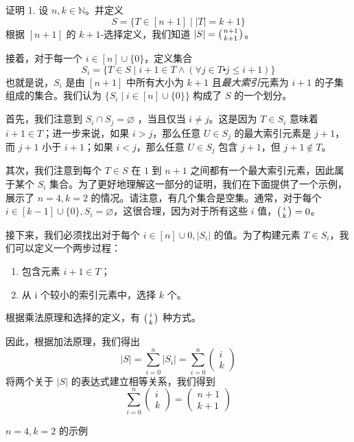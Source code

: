 \begin{proofs}{证明 1.}
    设 $n,k \in \mathbb{N}$。并定义
    \[S = \{T \in [n + 1] \mid |T| = k + 1\}\]
    根据 $[n+1]$ 的 $k+1$-选择定义，我们知道 $|S| = \big({n+1 \atop k+1}\big)$。

    接着，对于每一个 $i \in [n] \cup \{0\}$，定义集合
    \[S_i = \{T \in S \mid i + 1 \in T \land (\forall j \in T \centerdot j \le i + 1)\}\]
    也就是说，$S_i$ 是由 $[n + 1]$ 中所有大小为 $k + 1$ 且\emph{最大索引}元素为 $i + 1$ 的子集组成的集合。我们认为 $\{S_i \mid i \in [n] \cup \{0\}\}$ 构成了 $S$ 的一个划分。

    首先，我们注意到 $S_i \cap S_j = \varnothing$ ，当且仅当 $i \ne j$。这是因为 $T ∈ S_i$ 意味着 $i + 1 \in T$；进一步来说，如果 $i > j$，那么任意 $U \in S_j$ 的最大索引元素是 $j + 1$，而 $j + 1$ 小于 $i + 1$；如果 $i < j$，那么任意 $U ∈ S_j$ 包含 $j + 1$，但 $j + 1 \notin T$。

    其次，我们注意到每个 $T \in S$ 在 $1$ 到 $n + 1$ 之间都有一个最大索引元素，因此属于某个 $S_i$ 集合。为了更好地理解这一部分的证明，我们在下面提供了一个示例，展示了 $n = 4, k = 2$ 的情况。请注意，有几个集合是空集。通常，对于每个 $i \in [k - 1] \cup \{0\}, S_i=\varnothing$，这很合理，因为对于所有这些 $i$ 值，$\big({i \atop k}\big)=0$。

    接下来，我们必须找出对于每个 $i \in [n] \cup {0}, |S_i|$ 的值。为了构建元素 $T \in S_i$，我们可以定义一个两步过程：
    \begin{enumerate}[label=(\arabic*)]
        \item 包含元素 $i + 1 \in T$；
        \item 从 i 个较小的索引元素中，选择 $k$ 个。
    \end{enumerate}
    根据乘法原理和选择的定义，有 $\big({i \atop k}\big)$ 种方式。

    因此，根据加法原理，我们得出
    \[|S| = \sum_{i=0}^{n} |S_i| = \sum_{i=0}^{n} \begin{pmatrix}i\\k\end{pmatrix}\]
    将两个关于 $|S|$ 的表达式建立相等关系，我们得到
    \[\sum_{i=0}^{n} \begin{pmatrix}i\\k\end{pmatrix} = \begin{pmatrix}n+1\\k+1\end{pmatrix}\]
\end{proofs}

$n = 4, k = 2$ 的示例

